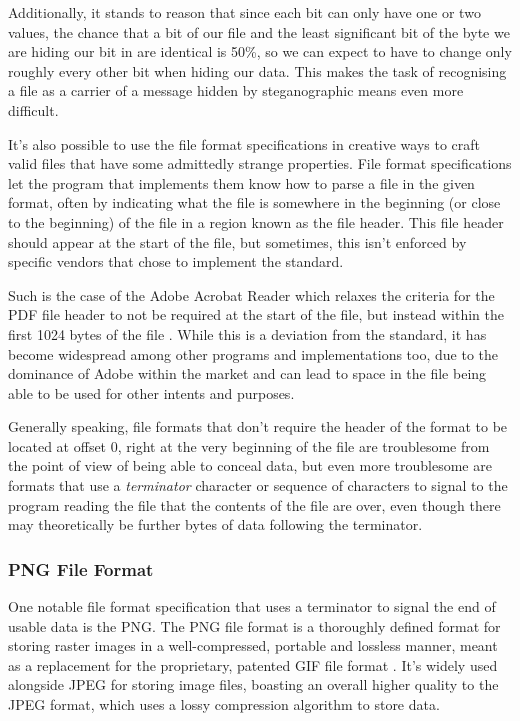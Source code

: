 Additionally, it stands to reason that since each bit can only have one or two values, the chance that a bit of our file 
and the least significant bit of the byte we are hiding our bit in are identical is 50\%, so we can expect to have to
change only roughly every other bit when hiding our data. This makes the task of recognising a file as a carrier of a
message hidden by steganographic means even more difficult.

It's also possible to use the file format specifications in creative ways to craft valid files that have some admittedly
strange properties. File format specifications let the program that implements them know how to parse 
a file in the given format, often by indicating what the file is somewhere in the beginning (or close to the beginning)
of the file in a region known as the file header. This file header should appear at the start of the file, but
sometimes, this isn't enforced by specific vendors that chose to implement the standard. 

Such is the case of the Adobe Acrobat Reader which relaxes the criteria for the \acrfull{PDF} file header to not be
required at the start of the file, but instead within the first 1024 bytes of the file \cite{adobe-acrobat-pdf}. 
While this is a deviation from the standard, it has become widespread among other programs and implementations too, 
due to the dominance of Adobe within the market and can lead to space in the file being able to be used for other 
intents and purposes.

Generally speaking, file formats that don't require the header of the format to be located at offset 0, right at the
very beginning of the file are troublesome from the point of view of being able to conceal data, but even more 
troublesome are formats that use a \emph{terminator} character or sequence of characters to signal to the program reading 
the file that the contents of the file are over, even though there may theoretically be further bytes of data following 
the terminator.

\subsubsection{\acrfull{PNG} File Format}

One notable file format specification that uses a terminator to signal the end of usable data is the \acrfull{PNG}.
The \acrshort{PNG} file format is a thoroughly defined format for storing raster images in a well-compressed, portable
and lossless manner, meant as a replacement for the proprietary, patented \acrfull{GIF} file format \cite{png-standard}.
It's widely used alongside \acrshort{JPEG} for storing image files, boasting an overall higher quality to the
\acrshort{JPEG} format, which uses a lossy compression algorithm to store data. %

